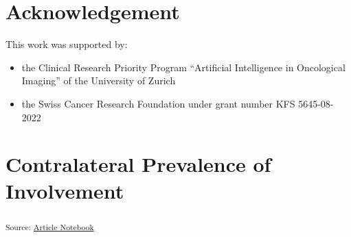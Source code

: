 \documentclass[
  sn-mathphys-num,
]{sn-jnl}
\providecommand{\tightlist}{%
  \setlength{\itemsep}{0pt}\setlength{\parskip}{0pt}}\usepackage{longtable,booktabs,array}
\begin{document}
\section{Acknowledgement}\label{acknowledgement}

This work was supported by:

\begin{itemize}
\tightlist
\item
  the Clinical Research Priority Program ``Artificial Intelligence in
  Oncological Imaging'' of the University of Zurich
\item
  the Swiss Cancer Research Foundation under grant number KFS
  5645-08-2022
\end{itemize}

\section{Contralateral Prevalence of
Involvement}\label{contralateral-prevalence-of-involvement}

\textsubscript{Source:
\href{https://rmnldwg.github.io/bilateral-paper/manuscript-preview.html}{Article
Notebook}}
\end{document}
